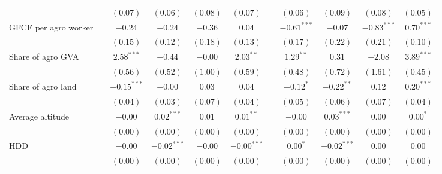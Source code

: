 \begin{table}
\begin{center}
\begin{tabular}{l c c c c c c c c c c}
                                  &               & $(0.07)$      & $(0.06)$      & $(0.08)$       & $(0.07)$       &               & $(0.06)$      & $(0.09)$      & $(0.08)$      & $(0.05)$       \\
GFCF per agro worker              &               & $-0.24$       & $-0.24$       & $-0.36$        & $0.04$         &               & $-0.61^{***}$ & $-0.07$       & $-0.83^{***}$ & $0.70^{***}$   \\
                                  &               & $(0.15)$      & $(0.12)$      & $(0.18)$       & $(0.13)$       &               & $(0.17)$      & $(0.22)$      & $(0.21)$      & $(0.10)$       \\
Share of agro GVA                 &               & $2.58^{***}$  & $-0.44$       & $-0.00$        & $2.03^{**}$    &               & $1.29^{**}$   & $0.31$        & $-2.08$       & $3.89^{***}$   \\
                                  &               & $(0.56)$      & $(0.52)$      & $(1.00)$       & $(0.59)$       &               & $(0.48)$      & $(0.72)$      & $(1.61)$      & $(0.45)$       \\
Share of agro land                &               & $-0.15^{***}$ & $-0.00$       & $0.03$         & $0.04$         &               & $-0.12^{*}$   & $-0.22^{**}$  & $0.12$        & $0.20^{***}$   \\
                                  &               & $(0.04)$      & $(0.03)$      & $(0.07)$       & $(0.04)$       &               & $(0.05)$      & $(0.06)$      & $(0.07)$      & $(0.04)$       \\
Average altitude                  &               & $-0.00$       & $0.02^{***}$  & $0.01$         & $0.01^{**}$    &               & $-0.00$       & $0.03^{***}$  & $0.00$        & $0.00^{*}$     \\
                                  &               & $(0.00)$      & $(0.00)$      & $(0.00)$       & $(0.00)$       &               & $(0.00)$      & $(0.00)$      & $(0.00)$      & $(0.00)$       \\
HDD                               &               & $-0.00$       & $-0.02^{***}$ & $-0.00$        & $-0.00^{***}$  &               & $0.00^{*}$    & $-0.02^{***}$ & $0.00$        & $0.00$         \\
                                  &               & $(0.00)$      & $(0.00)$      & $(0.00)$       & $(0.00)$       &               & $(0.00)$      & $(0.00)$      & $(0.00)$      & $(0.00)$       \\

\end{tabular}
\end{center}
\end{table}
